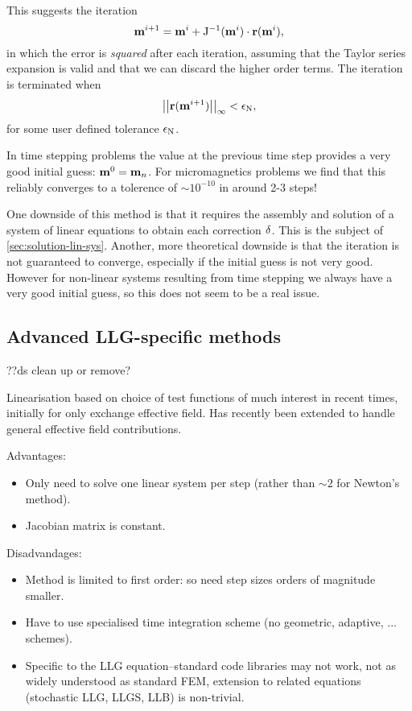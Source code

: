 This suggests the iteration
\begin{equation}
  \mathbf{m}^{i+1} = \mathbf{m}^i + \mathrm{J}^{-1}(\mathbf{m}^i) \cdot \mathbf{r}(\mathbf{m}^i),
\end{equation}
in which the error is \emph{squared} after each iteration, assuming that the Taylor series expansion is valid and that we can discard the higher order terms.
The iteration is terminated when
\begin{equation}
  \left| \left| \mathbf{r}(\mathbf{m}^{i+1}) \right| \right|_{\infty} < \epsilon_{\text{N}},
\end{equation}
for some user defined tolerance $\epsilon_{\text{N}}$.

In time stepping problems the value at the previous time step provides a very good initial guess: $\mathbf{m}^0 = \mathbf{m}_n$.
For micromagnetics problems we find that this reliably converges to a tolerence of $\sim 10^{-10}$ in around 2-3 steps!

One downside of this method is that it requires the assembly and solution of a system of linear equations to obtain each correction $\mathbf{\delta}$.
This is the subject of \cref{sec:solution-lin-sys}.
Another, more theoretical downside is that the iteration is not guaranteed to converge, especially if the initial guess is not very good.
However for non-linear systems resulting from time stepping we always have a very good initial guess, so this does not seem to be a real issue.


\subsection{Advanced LLG-specific methods}
\label{sec:advanced-lin}

??ds clean up or remove?

Linearisation based on choice of test functions of much interest in recent times, initially for only exchange effective field\cite{Alouges2008}.
Has recently been extended to handle general effective field contributions\cite{Banas2012}.

Advantages:
\begin{itemize}
\item Only need to solve one linear system per step (rather than $\sim 2$ for Newton's method).
\item Jacobian matrix is constant.
\end{itemize}

Disadvandages:
\begin{itemize}
\item Method is limited to first order: so need step sizes orders of magnitude smaller.
\item Have to use specialised time integration scheme (no geometric, adaptive, ... schemes).
\item Specific to the LLG equation--standard code libraries may not work, not as widely understood as standard FEM, extension to related equations (stochastic LLG, LLGS, LLB) is non-trivial.
\end{itemize}


